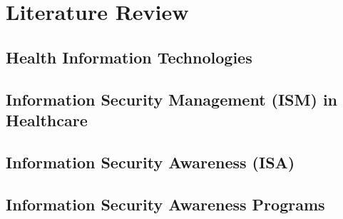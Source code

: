 \chapter{Literature Review}
\label{c:literatur}




\section{Health Information Technologies}
\label{c:literatur:summaries:info-sec-awa-helth}


\section{Information Security Management (ISM) in Healthcare }
\label{c:literatur:summaries:Information Security}


%

\section{Information Security Awareness (ISA)}
\label{c:literatur:summaries:info-sec-awa}


%

\section{Information Security Awareness Programs }
\label{c:literatur:summaries:info-sec-awa-prog}



%
